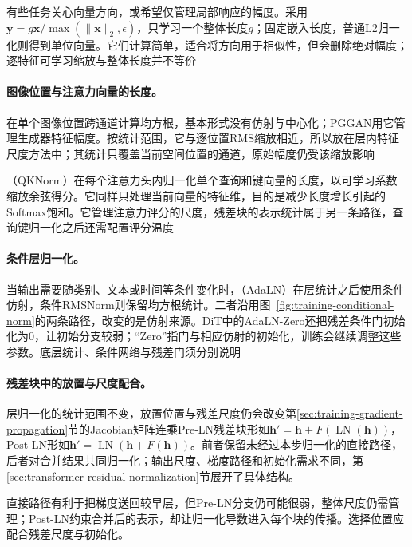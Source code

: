 有些任务关心向量方向，或希望仅管理局部响应的幅度。采用$\bm y=g\bm x/\max(\lVert\bm x\rVert_2,\epsilon)$，只学习一个整体长度$g$；固定嵌入长度，普通L2归一化则得到单位向量。它们计算简单，适合将方向用于相似性，但会删除绝对幅度；逐特征可学习缩放与整体长度并不等价

\paragraph{图像位置与注意力向量的长度。}

在单个图像位置跨通道计算均方根，基本形式没有仿射与中心化；PGGAN用它管理生成器特征幅度。按统计范围，它与逐位置RMS缩放相近，所以放在层内特征尺度方法中；其统计只覆盖当前空间位置的通道，原始幅度仍受该缩放影响

（QKNorm）在每个注意力头内归一化单个查询和键向量的长度，以可学习系数缩放余弦得分。它同样只处理当前向量的特征维，目的是减少长度增长引起的Softmax饱和。它管理注意力评分的尺度，残差块的表示统计属于另一条路径，查询键归一化之后还需配置评分温度

\paragraph{条件层归一化。}

当输出需要随类别、文本或时间等条件变化时，（AdaLN）在层统计之后使用条件仿射，条件RMSNorm则保留均方根统计。二者沿用图~\ref{fig:training-conditional-norm}的两条路径，改变的是仿射来源。DiT中的AdaLN-Zero还把残差条件门初始化为0，让初始分支较弱；“Zero”指门与相应仿射的初始化，训练会继续调整这些参数。底层统计、条件网络与残差门须分别说明

\paragraph{残差块中的放置与尺度配合。}

层归一化的统计范围不变，放置位置与残差尺度仍会改变第\ref{sec:training-gradient-propagation}节的Jacobian矩阵连乘Pre-LN残差块形如$\bm h'=\bm h+F(\operatorname{LN}(\bm h))$，Post-LN形如$\bm h'=\operatorname{LN}(\bm h+F(\bm h))$。前者保留未经过本步归一化的直接路径，后者对合并结果共同归一化；输出尺度、梯度路径和初始化需求不同，第\ref{sec:transformer-residual-normalization}节展开了具体结构。

直接路径有利于把梯度送回较早层，但Pre-LN分支仍可能很弱，整体尺度仍需管理；Post-LN约束合并后的表示，却让归一化导数进入每个块的传播。选择位置应配合残差尺度与初始化。

